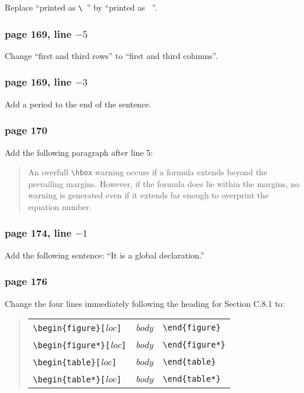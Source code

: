 Replace ``printed as \verb*|\ |'' by ``printed as \verb*| |''.

\subsubsection*{page 169, line $-5$}
Change ``first and third rows'' to ``first and third columns''.

\subsubsection*{page 169, line $-3$}
Add a period to the end of the sentence.

\subsubsection*{page 170}

Add the following paragraph after line 5:
\begin{quote}
An overfull \verb|\hbox| warning occurs if a formula extends beyond the
prevailing margins.  However, if the formula does lie within the
margins, no warning is generated even if it extends far enough to
overprint the equation number.
\end{quote}

\subsubsection*{page 174, line $-1$}
Add the following sentence: ``It is a global declaration.''

\subsubsection*{page 176}

Change the four lines immediately following the heading for
Section C.8.1 to:
\begin{quote}
\begin{tabular}{lll}
 \verb|\begin{figure}[|{\em loc\/}{\tt ]} & {\em body\/}
      & \verb|\end{figure}| \\
 \verb|\begin{figure*}[|{\em loc\/}{\tt ]} & {\em body\/}
      & \verb|\end{figure*}| \\
 \verb|\begin{table}[|{\em loc\/}{\tt ]} & {\em body\/}
      & \verb|\end{table}| \\
 \verb|\begin{table*}[|{\em loc\/}{\tt ]} & {\em body\/}
      & \verb|\end{table*}| 
\end{tabular}
\end{quote}


